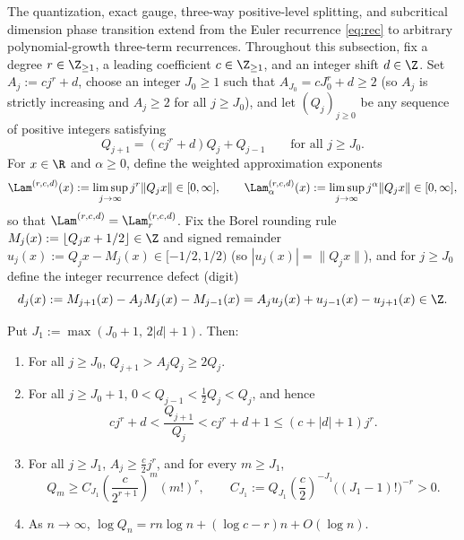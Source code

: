 The quantization, exact gauge, three-way positive-level splitting, and
subcritical dimension phase transition extend from the Euler recurrence
\eqref{eq:rec} to arbitrary polynomial-growth three-term recurrences. Throughout
this subsection, fix a degree $r\in\Z_{\ge1}$, a leading coefficient
$c\in\Z_{\ge1}$, and an integer shift $d\in\Z$. Set $A_j:=cj^r+d$, choose an
integer $J_0\ge1$ such that $A_{J_0}=cJ_0^r+d\ge2$ (so $A_j$ is strictly
increasing and $A_j\ge2$ for all $j\ge J_0$), and let $(Q_j)_{j\ge0}$ be any
sequence of positive integers satisfying
\begin{equation}\label{eq:poly-rec}
Q_{j+1}=(cj^r+d)Q_j+Q_{j-1}\qquad\text{for all }j\ge J_0.
\end{equation}
For $x\in\R$ and $\alpha\ge0$, define the weighted approximation exponents
\[
\Lam^{(r,c,d)}(x):=\limsup_{j\to\infty}j^r\|Q_jx\|\in[0,\infty],\qquad
\Lam_\alpha^{(r,c,d)}(x):=\limsup_{j\to\infty}j^\alpha\|Q_jx\|\in[0,\infty],
\]
so that $\Lam^{(r,c,d)}=\Lam_r^{(r,c,d)}$. Fix the Borel rounding rule
$M_j(x):=\lfloor Q_jx+1/2\rfloor\in\Z$ and signed remainder
$u_j(x):=Q_jx-M_j(x)\in[-1/2,1/2)$ (so $|u_j(x)|=\|Q_jx\|$), and for $j\ge J_0$
define the integer recurrence defect (digit)
\begin{equation}\label{eq:poly-defect-id}
d_j(x):=M_{j+1}(x)-A_jM_j(x)-M_{j-1}(x)=A_ju_j(x)+u_{j-1}(x)-u_{j+1}(x)\in\Z.
\end{equation}

\begin{lemma}\label{lem:poly-growth}
Put $J_1:=\max(J_0+1,\,2|d|+1)$. Then:
\begin{enumerate}[label=(\roman*),leftmargin=2em]
\item For all $j\ge J_0$, $Q_{j+1}>A_jQ_j\ge2Q_j$.
\item For all $j\ge J_0+1$, $0<Q_{j-1}<\frac12Q_j<Q_j$, and hence
\[
cj^r+d<\frac{Q_{j+1}}{Q_j}<cj^r+d+1\le(c+|d|+1)j^r.
\]
\item For all $j\ge J_1$, $A_j\ge\frac{c}{2}j^r$, and for every $m\ge J_1$,
\[
Q_m\ge C_{J_1}\left(\frac{c}{2^{r+1}}\right)^m(m!)^r,\qquad
C_{J_1}:=Q_{J_1}\left(\frac{c}{2}\right)^{-J_1}\bigl((J_1-1)!\bigr)^{-r}>0.
\]
\item As $n\to\infty$, $\log Q_n=rn\log n+(\log c-r)n+O(\log n)$.
\end{enumerate}
\end{lemma}

